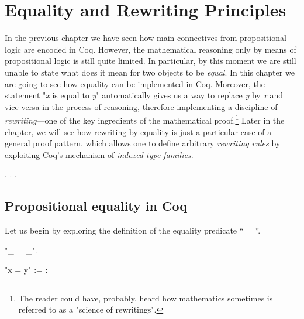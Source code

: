 \begin{coqdoccode}
\coqdocemptyline
\coqdocemptyline
\end{coqdoccode}

\chapter{Equality and Rewriting Principles}
\label{ch:eqrew}



In the previous chapter we have seen how main connectives from
propositional logic are encoded in Coq. However, the mathematical
reasoning only by means of propositional logic is still quite
limited. In particular, by this moment we are still unable to state
what does it mean for two objects to be \textit{equal}. In this chapter we
are going to see how equality can be implemented in Coq. Moreover, the
statement "\textit{x} is equal to \textit{y}" automatically gives us a way to
replace \textit{y} by \textit{x} and vice versa in the process of reasoning,
therefore implementing a discipline of \textit{rewriting}---one of the key
ingredients of the mathematical proof.\footnote{The reader could
have, probably, heard how mathematics sometimes is referred to as a
"science of rewritings".} Later in the chapter, we will see how
rewriting by equality is just a particular case of a general proof
pattern, which allows one to define arbitrary \textit{rewriting rules} by
exploiting Coq's mechanism of \textit{indexed type families}.


\begin{coqdoccode}
\coqdocemptyline
\coqdocnoindent
{} \coqdoceol
\coqdocnoindent
{}     .\coqdoceol
\coqdocnoindent
{}  .\coqdoceol
\coqdocnoindent
{}   .\coqdoceol
\coqdocemptyline
\coqdocemptyline
\end{coqdoccode}
\section{Propositional equality in Coq}


\label{sec:propeq}


Let us begin by exploring the definition of the equality predicate ``\coqdocvar{\_}
= \coqdocvar{\_}''.


\begin{coqdoccode}
\coqdocemptyline
\coqdocnoindent
{} "\_ = \_".\coqdoceol
\coqdocemptyline
\end{coqdoccode}
\coqdoceol
\coqdocemptyline
\coqdocnoindent
"x = y" :=       : 

